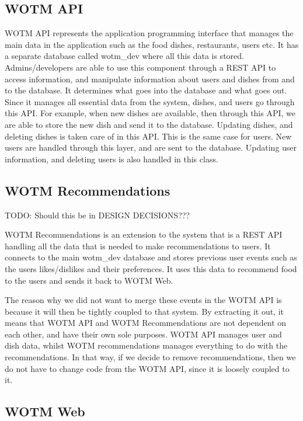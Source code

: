 \subsection{WOTM API}

WOTM API represents the application programming interface that manages the main data in the application such as the food dishes, restaurants, users etc. It has a separate database called wotm\_dev where all this data is stored. Admins/developers are able to use this component through a REST API to access information, and manipulate information about users and dishes from and to the database. It determines what goes into the database and what goes out. Since it manages all essential data from the system, dishes, and users go through this API. For example, when new dishes are available, then through this API, we are able to store the new dish and send it to the database. Updating dishes, and deleting dishes is taken care of in this API. This is the same case for users. New users are handled through this layer, and are sent to the database. Updating user information, and deleting users is also handled in this class.

\subsection{WOTM Recommendations}
TODO: Should this be in DESIGN DECISIONS???

WOTM Recommendations is an extension to the system that is a REST API handling all the data that is needed to make recommendations to users. It connects to the main wotm\_dev database and stores previous user events such as the users likes/dislikes and their preferences. It uses this data to recommend food to the users and sends it back to WOTM Web. 

The reason why we did not want to merge these events in the WOTM API is because it will then be tightly coupled to that system. By extracting it out, it means that WOTM API and WOTM Recommendations are not dependent on each other, and have their own sole purposes. WOTM API manages user and dish data, whilst WOTM recommendations manages everything to do with the recommendations. In that way, if we decide to remove recommendations, then we do not have to change code from the WOTM API, since it is loosely coupled to it. 

\subsection{WOTM Web}

